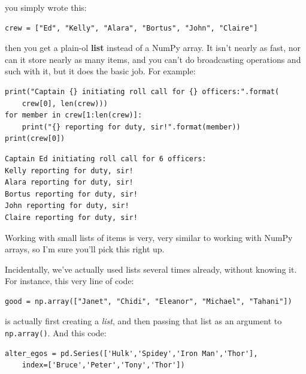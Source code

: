you simply wrote this:

\begin{Verbatim}[fontsize=\small,samepage=true,frame=single,framesep=3mm]
crew = ["Ed", "Kelly", "Alara", "Bortus", "John", "Claire"]
\end{Verbatim}


then you get a plain-ol \textbf{list} instead of a NumPy array. It isn't nearly
as fast, nor can it store nearly as many items, and you can't do broadcasting
operations and such with it, but it does the basic job. For example:


\begin{Verbatim}[fontsize=\small,samepage=true,frame=single,framesep=3mm]
print("Captain {} initiating roll call for {} officers:".format(
    crew[0], len(crew)))
for member in crew[1:len(crew)]:
    print("{} reporting for duty, sir!".format(member))
print(crew[0])
\end{Verbatim}

\vspace{-.2in}

\begin{Verbatim}[fontsize=\small,samepage=true,frame=leftline,framesep=5mm,framerule=1mm]
Captain Ed initiating roll call for 6 officers:
Kelly reporting for duty, sir!
Alara reporting for duty, sir!
Bortus reporting for duty, sir!
John reporting for duty, sir!
Claire reporting for duty, sir!
\end{Verbatim}

Working with small lists of items is very, very similar to working with NumPy
arrays, so I'm sure you'll pick this right up.

Incidentally, we've actually used lists several times already, without knowing
it. For instance, this very line of code:

\begin{Verbatim}[fontsize=\small,samepage=true,frame=single,framesep=3mm]
good = np.array(["Janet", "Chidi", "Eleanor", "Michael", "Tahani"])
\end{Verbatim}

is actually first creating a \textit{list}, and then passing that list as an
argument to \texttt{np.array()}. And this code:

\begin{Verbatim}[fontsize=\small,samepage=true,frame=single,framesep=3mm]
alter_egos = pd.Series(['Hulk','Spidey','Iron Man','Thor'],
    index=['Bruce','Peter','Tony','Thor'])
\end{Verbatim}

